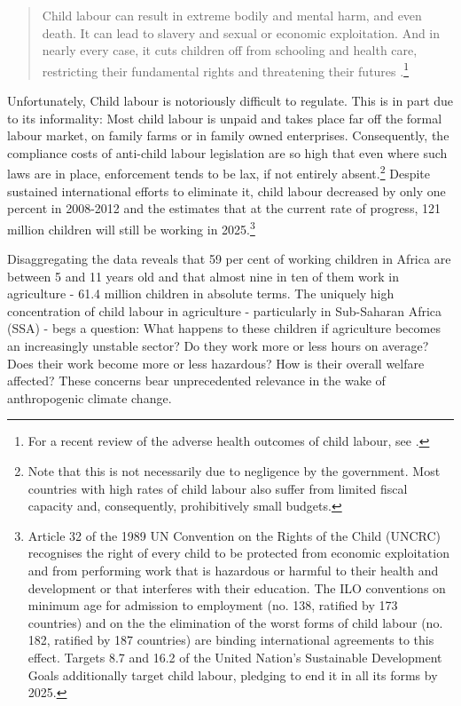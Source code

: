 \documentclass[a4paper,12pt]{article}
\theoremstyle{plain}
\theoremstyle{definition}
\theoremstyle{definition}
\theoremstyle{definition}
\theoremstyle{definition}
\begin{document}
\begin{quote}
    Child labour can result in extreme bodily and mental harm, and even death. It can lead to slavery and sexual or economic exploitation. And in nearly every case, it cuts children off from schooling and health care, restricting their fundamental rights and threatening their futures \citep{UNICEF2020}.\footnote{For a recent review of the adverse health outcomes of child labour, see \citet{Ibrahim2018}.}
\end{quote}

Unfortunately, Child labour is notoriously difficult to regulate. This is in part due to its informality: Most child labour is unpaid and takes place far off the formal labour market, on family farms or in family owned enterprises. Consequently, the compliance costs of anti-child labour legislation are so high that even where such laws are in place, enforcement tends to be lax, if not entirely absent.\footnote{Note that this is not necessarily due to negligence by the government. Most countries with high rates of child labour also suffer from limited fiscal capacity and, consequently, prohibitively small budgets.} Despite sustained international efforts to eliminate it, child labour decreased by only one percent in 2008-2012 and the \citet{ILO2017} estimates that at the current rate of progress, 121 million children will still be working in 2025.\footnote{Article 32 of the 1989 UN Convention on the Rights of the Child (UNCRC) recognises the right of every child to be protected from economic exploitation and from performing work that is hazardous or harmful to their health and development or that interferes with their education. The ILO conventions on minimum age for admission to employment (no. 138, ratified by 173 countries) and on the the elimination of the worst forms of child labour (no. 182, ratified by 187 countries) are binding international agreements to this effect. Targets 8.7 and 16.2 of the United Nation's Sustainable Development Goals additionally target child labour, pledging to end it in all its forms by 2025.}

Disaggregating the data reveals that 59 per cent of working children in Africa are between 5 and 11 years old and that almost nine in ten of them work in agriculture - 61.4 million children in absolute terms. The uniquely high concentration of child labour in agriculture - particularly in Sub-Saharan Africa (SSA) - begs a question: What happens to these children if agriculture becomes an increasingly unstable sector? Do they work more or less hours on average? Does their work become more or less hazardous? How is their overall welfare affected? These concerns bear unprecedented relevance in the wake of anthropogenic climate change.
\end{document}
